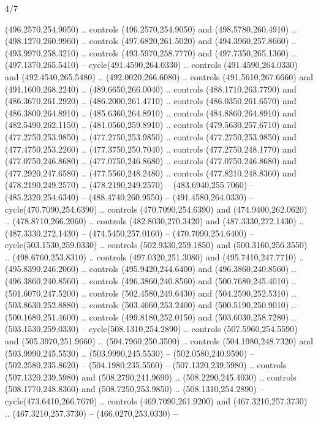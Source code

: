\begin{flagdescription}{4/7}
\begin{scope}[shift={(0.5\flaglength,0.5\flagwidth)},scale=\flagwidth*\stretchfactor/820]
\begin{scope}[scale=1.87,xshift=-138mm,yshift=75mm]
\begin{scope}[y=0.8pt, x=0.8pt, yscale=-1, xscale=1]
\begin{scope}[fill=c4d2a15]
  (496.2570,254.9050) .. controls (496.2570,254.9050) and (498.5780,260.4910) ..
  (498.1270,260.9960) .. controls (497.6820,261.5020) and (494.3960,257.8660) ..
  (493.9970,258.3210) .. controls (493.5970,258.7770) and (497.7350,265.1360) ..
  (497.1370,265.5410) -- cycle(491.4590,264.0330) .. controls
  (491.4590,264.0330) and (492.4540,265.5480) .. (492.0020,266.6080) .. controls
  (491.5610,267.6660) and (491.1600,268.2240) .. (489.6650,266.0040) .. controls
  (488.1710,263.7790) and (486.3670,261.2920) .. (486.2000,261.4710) .. controls
  (486.0350,261.6570) and (486.3800,264.8910) .. (485.6360,264.8910) .. controls
  (484.8860,264.8910) and (482.5490,262.1150) .. (481.0560,259.8910) .. controls
  (479.5630,257.6710) and (477.2750,253.9850) .. (477.2750,253.9850) .. controls
  (477.2750,253.9850) and (477.4750,253.2260) .. (477.3750,250.7040) .. controls
  (477.2750,248.1770) and (477.0750,246.8680) .. (477.0750,246.8680) .. controls
  (477.0750,246.8680) and (477.2920,247.6580) .. (477.5560,248.2480) .. controls
  (477.8210,248.8360) and (478.2190,249.2570) .. (478.2190,249.2570) --
  (483.6940,255.7060) -- (485.2320,254.6340) -- (488.4740,260.9550) --
  (491.4580,264.0330) -- cycle(470.7090,254.6390) .. controls
  (470.7090,254.6390) and (474.9400,262.0620) .. (478.8710,266.2060) .. controls
  (482.8030,270.3420) and (487.3330,272.1430) .. (487.3330,272.1430) --
  (474.5450,257.0160) -- (470.7090,254.6400) -- cycle(503.1530,259.0330) ..
  controls (502.9330,259.1850) and (500.3160,256.3550) .. (498.6760,253.8310) ..
  controls (497.0320,251.3080) and (495.7410,247.7710) .. (495.8390,246.2060) ..
  controls (495.9420,244.6400) and (496.3860,240.8560) .. (496.3860,240.8560) ..
  controls (496.3860,240.8560) and (500.7680,245.4010) .. (501.6070,247.5200) ..
  controls (502.4580,249.6430) and (504.2590,252.5310) .. (503.8630,252.8880) ..
  controls (503.4660,253.2400) and (500.5190,250.9010) .. (500.1680,251.4600) ..
  controls (499.8180,252.0150) and (503.6030,258.7280) .. (503.1530,259.0330) --
  cycle(508.1310,254.2890) .. controls (507.5960,254.5590) and
  (505.3970,251.9660) .. (504.7960,250.3500) .. controls (504.1980,248.7320) and
  (503.9990,245.5530) .. (503.9990,245.5530) -- (502.0580,240.9590) --
  (502.2580,235.8620) -- (504.1980,235.5560) -- (507.1320,239.5980) .. controls
  (507.1320,239.5980) and (508.2790,241.9690) .. (508.2290,245.4030) .. controls
  (508.1770,248.8360) and (508.7250,253.9850) .. (508.1310,254.2890) --
  cycle(473.6410,266.7670) .. controls (469.7090,261.9200) and
  (467.3210,257.3730) .. (467.3210,257.3730) -- (466.0270,253.0330) --

\end{scope}
\end{scope}
\end{scope}
\end{scope}
\end{flagdescription}

